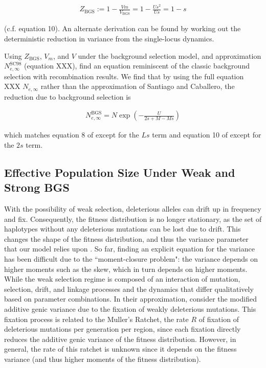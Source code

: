 \documentclass[11pt]{article}
\begin{document}
\begin{align}
  Z_\text{BGS} := 1 - \frac{Vm}{V_\text{BGS}} = 1 - \frac{Us^2}{Us} = 1 - s
\end{align}

(c.f. \cite{Santiago1998-bs} equation 10). An alternate derivation can be found
by working out the deterministic reduction in variance from the single-locus
dynamics. 

Using $Z_\text{BGS}$, $V_m$, and $V$ under the background selection model, and
approximation $N_{e,\infty}^\text{SC98}$ (equation XXX), find an equation
reminiscent of the classic background selection with recombination results. We
find that by using the full equation XXX $N_{e,\infty}$ rather than the
approximation of Santiago and Caballero, the reduction due to background
selection is

\begin{align}
  N_{e,\infty}^\text{BGS} = N \exp\left( - \frac{U}{2s + M - Ms} \right)
\end{align}

which matches equation 8 of \textcite{Hudson1995-xc} except for the $Ls$ term
and equation 10 of \textcite{Nordborg1996-nq} except for the $2s$ term.

\subsection*{Effective Population Size Under Weak and Strong BGS}

With the possibility of weak selection, deleterious alleles can drift up in
frequency and fix. Consequently, the fitness distribution is no longer
stationary, as the set of haplotypes without any deleterious mutations can be
lost due to drift. This changes the shape of the fitness distribution, and thus
the variance parameter that our model relies upon
\parencite{Gessler1995-hz,OFallon2010-my,Good2013-lp,Haigh1978-gt,Higgs1995-xc}.
So far, finding an explicit equation for the variance has been difficult due to
the ``moment-closure problem": the variance depends on higher moments such as
the skew, which in turn depends on higher moments. While the weak selection
regime is composed of an interaction of mutation, selection, drift, and linkage
processes and the dynamics that differ qualitatively based on parameter
combinations. In their approximation, \textcite{Santiago2016-mu} consider the
modified additive genic variance due to the fixation of weakly deleterious
mutations. This fixation process is related to the Muller's Ratchet, the rate
$R$ of fixation of deleterious mutations per generation per region, since each
fixation directly reduces the additive genic variance of the fitness
distribution. However, in general, the rate of this ratchet is unknown since it
depends on the fitness variance (and thus higher moments of the fitness
distribution).
\end{document}
